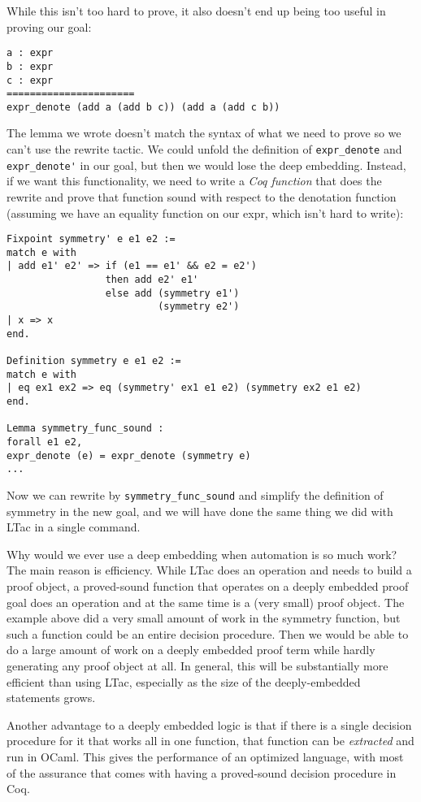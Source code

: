 \documentclass{puthesis}
\begin{document}
While this isn't too hard to prove, it also doesn't end up being too
useful in proving our goal:

\begin{lstlisting}
a : expr
b : expr
c : expr
======================
expr_denote (add a (add b c)) (add a (add c b))  
\end{lstlisting}

The lemma we wrote doesn't match the syntax of what we need to prove
so we can't use the rewrite tactic. We could unfold the definition of
\lstinline|expr_denote| and \lstinline|expr_denote'| in our goal, but
then we would lose the deep embedding. Instead, if we want this
functionality, we need to write a \emph{Coq function} that does the
rewrite and prove that function sound with respect to the denotation
function (assuming we have an equality function on our expr, which
isn't hard to write):

\begin{lstlisting}
Fixpoint symmetry' e e1 e2 := 
match e with
| add e1' e2' => if (e1 == e1' && e2 = e2') 
                 then add e2' e1' 
                 else add (symmetry e1') 
                          (symmetry e2')
| x => x
end.

Definition symmetry e e1 e2 :=
match e with
| eq ex1 ex2 => eq (symmetry' ex1 e1 e2) (symmetry ex2 e1 e2)
end.

Lemma symmetry_func_sound : 
forall e1 e2,
expr_denote (e) = expr_denote (symmetry e)
...
\end{lstlisting}

Now we can rewrite by \lstinline|symmetry_func_sound| and simplify the definition
of symmetry in the new goal, and we will have done the same thing we
did with LTac in a single command.

Why would we ever use a deep embedding when automation is so much
work? The main reason is efficiency. While LTac does an operation and
needs to build a proof object, a proved-sound function that operates on
a deeply embedded proof goal does an operation and at the same time is
a (very small) proof object. The example above did a very small amount
of work in the symmetry function, but such a function could be an
entire decision procedure. Then we would be able to do a large
amount of work on a deeply embedded proof term while hardly generating
any proof object at all. In general, this will be substantially more
efficient than using LTac, especially as the size of the
deeply-embedded statements grows. 

Another advantage to a deeply embedded logic is that if there is a
single decision procedure for it that works all in one function, that
function can be \emph{extracted} and run in OCaml. This gives the
performance of an optimized language, with most of the assurance that
comes with having a proved-sound decision procedure in Coq.
\end{document}
